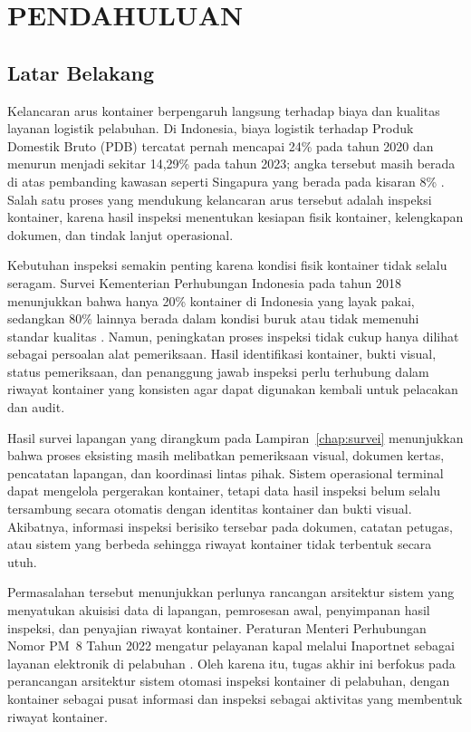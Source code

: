 \cleardoublepage
\chapter{PENDAHULUAN}
\label{chap:pendahuluan}

\section{Latar Belakang}

Kelancaran arus kontainer berpengaruh langsung terhadap biaya dan kualitas
layanan logistik pelabuhan. Di Indonesia, biaya logistik terhadap Produk
Domestik Bruto (PDB) tercatat pernah mencapai 24\% pada tahun 2020 dan menurun
menjadi sekitar 14,29\% pada tahun 2023; angka tersebut masih berada di atas
pembanding kawasan seperti Singapura yang berada pada kisaran 8\%
\autocite{kemenkeu2023nle,pelindo2023logistik}. Salah satu proses yang
mendukung kelancaran arus tersebut adalah inspeksi kontainer, karena hasil
inspeksi menentukan kesiapan fisik kontainer, kelengkapan dokumen, dan tindak
lanjut operasional.

Kebutuhan inspeksi semakin penting karena kondisi fisik kontainer tidak selalu
seragam. Survei Kementerian Perhubungan Indonesia pada tahun 2018 menunjukkan
bahwa hanya 20\% kontainer di Indonesia yang layak pakai, sedangkan 80\%
lainnya berada dalam kondisi buruk atau tidak memenuhi standar kualitas
\autocite{lukmandono2024}. Namun, peningkatan proses inspeksi tidak cukup hanya
dilihat sebagai persoalan alat pemeriksaan. Hasil identifikasi kontainer, bukti
visual, status pemeriksaan, dan penanggung jawab inspeksi perlu terhubung dalam
riwayat kontainer yang konsisten agar dapat digunakan kembali untuk pelacakan
dan audit.

Hasil survei lapangan yang dirangkum pada Lampiran~\ref{chap:survei}
menunjukkan bahwa proses eksisting masih melibatkan pemeriksaan visual,
dokumen kertas, pencatatan lapangan, dan koordinasi lintas pihak. Sistem
operasional terminal dapat mengelola pergerakan kontainer, tetapi data hasil
inspeksi belum selalu tersambung secara otomatis dengan identitas kontainer dan
bukti visual. Akibatnya, informasi inspeksi berisiko tersebar pada dokumen,
catatan petugas, atau sistem yang berbeda sehingga riwayat kontainer tidak
terbentuk secara utuh.

Permasalahan tersebut menunjukkan perlunya rancangan arsitektur sistem yang
menyatukan akuisisi data di lapangan, pemrosesan awal, penyimpanan hasil
inspeksi, dan penyajian riwayat kontainer. Peraturan Menteri Perhubungan Nomor
PM~8 Tahun 2022 mengatur pelayanan kapal melalui Inaportnet sebagai layanan
elektronik di pelabuhan \autocite{kemenhub2022}. Oleh karena itu, tugas akhir
ini berfokus pada perancangan arsitektur sistem otomasi inspeksi kontainer di
pelabuhan, dengan kontainer sebagai pusat informasi dan inspeksi sebagai
aktivitas yang membentuk riwayat kontainer.

